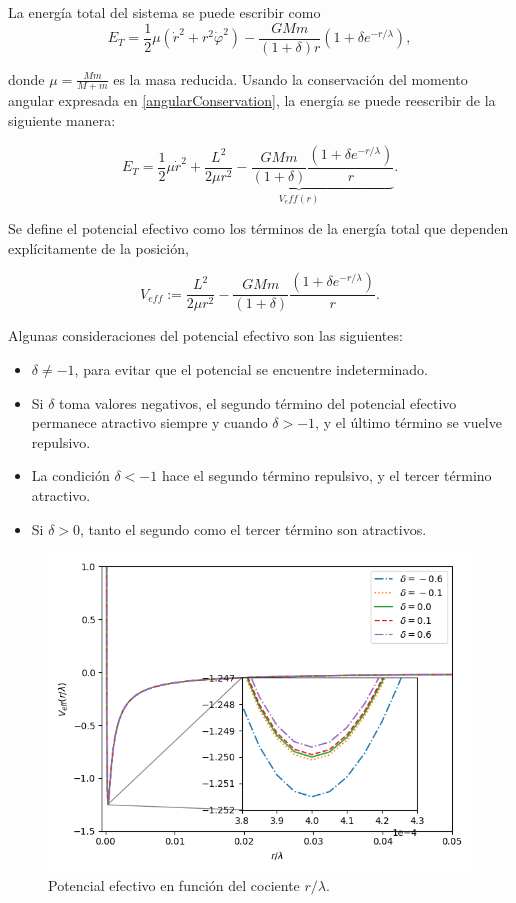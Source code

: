 \documentclass{article}
\begin{document}
La energía total del sistema se puede escribir como
\begin{equation}
	E_T=\frac{1}{2}\mu(\dot{r}^2+r^2\dot{\varphi}^2)-\frac{GMm}{(1+\delta)r}(1+\delta e^{-r/\lambda}),
\end{equation}

donde $\mu=\frac{Mm}{M+m}$ es la masa reducida. Usando la conservación del momento angular expresada en \eqref{angularConservation}, la energía se puede reescribir de la siguiente manera:

\begin{equation}
	E_T=\frac{1}{2}\mu\dot{r}^2+\underbrace{\frac{L^2}{2\mu r^2}-\frac{GMm}{(1+\delta)}\frac{(1+\delta e^{-r/\lambda})}{r}}_{V_eff(r)}.
\end{equation}

Se define el potencial efectivo como los términos de la energía total que dependen explícitamente de la posición,

\begin{equation}\label{EffPotential}
\boxed{V_{eff}:=\frac{L^2}{2\mu r^2}-\frac{GMm}{(1+\delta)}\frac{(1+\delta e^{-r/\lambda})}{r}.}
\end{equation}

Algunas consideraciones del potencial efectivo son las siguientes:

\begin{itemize}
	\item $\delta\neq -1$, para evitar que el potencial se encuentre indeterminado.
	\item Si $\delta$ toma valores negativos, el segundo término del potencial efectivo permanece atractivo siempre y cuando $\delta > -1$, y el último término se vuelve repulsivo.
	\item La condición $\delta <-1$ hace el segundo término repulsivo, y el tercer término atractivo.
	\item Si $\delta >0$, tanto el segundo como el tercer término son atractivos.
\end{itemize}

\begin{figure}
	\centering
	\includegraphics[width=.7\textwidth]{../veff.png}
	\caption{Potencial efectivo en función del cociente $r/\lambda$.}
	\label{fig:effPotential}
\end{figure}
\end{document}
